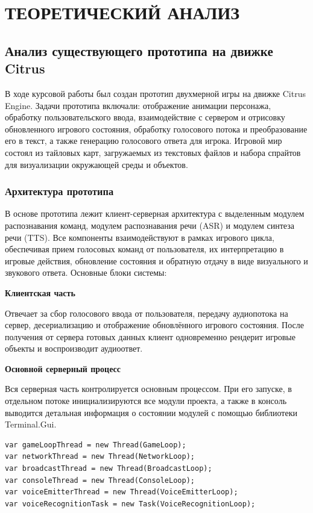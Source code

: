 \section{ТЕОРЕТИЧЕСКИЙ АНАЛИЗ}

    \subsection{Анализ существующего прототипа на движке Citrus}

        В ходе курсовой работы был создан прототип двухмерной игры на движке Citrus Engine. Задачи прототипа включали: отображение анимации персонажа, обработку пользовательского ввода, взаимодействие с сервером и отрисовку обновленного игрового состояния, обработку голосового потока и преобразование его в текст, а также генерацию голосового ответа для игрока. Игровой мир состоял из тайловых карт, загружаемых из текстовых файлов и набора спрайтов для визуализации окружающей среды и объектов.
        
        \subsubsection{Архитектура прототипа}

        В основе прототипа лежит клиент-серверная архитектура с выделенным модулем распознавания команд, модулем распознавания речи (ASR) и модулем синтеза речи (TTS). Все компоненты взаимодействуют в рамках игрового цикла, обеспечивая прием голосовых команд от пользователя, их интерпретацию в игровые действия, обновление состояния и обратную отдачу в виде визуального и звукового ответа. Основные блоки системы:

        \textbf{Клиентская часть}
        
        Отвечает за сбор голосового ввода от пользователя, передачу аудиопотока на сервер, десериализацию и отображение обновлённого игрового состояния. После получения от сервера готовых данных клиент одновременно рендерит игровые объекты и воспроизводит аудиоответ.

        \textbf{Основной серверный процесс}
        
        Вся серверная часть контролируется основным процессом. При его запуске, в отдельном потоке инициализируются все модули проекта, а также в консоль выводится детальная информация о состоянии модулей с помощью библиотеки Terminal.Gui.
        \begin{lstlisting}[caption=Инициализация модулей]
var gameLoopThread = new Thread(GameLoop);
var networkThread = new Thread(NetworkLoop);
var broadcastThread = new Thread(BroadcastLoop);
var consoleThread = new Thread(ConsoleLoop);
var voiceEmitterThread = new Thread(VoiceEmitterLoop);
var voiceRecognitionTask = new Task(VoiceRecognitionLoop);
        \end{lstlisting}

